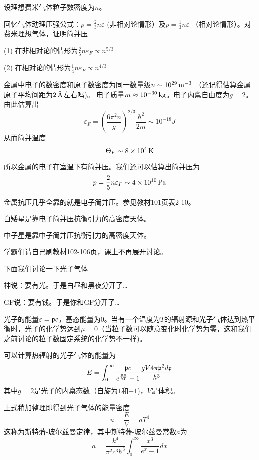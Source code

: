 \documentclass[CJK]{beamer}
\begin{document}
\begin{frame}
\bch
设理想费米气体粒子数密度为$n$。

\skiplines

回忆气体动理压强公式：$p =\frac{2}{3}n\bar\varepsilon$ (非相对论情形）及$p =\frac{1}{3}n\bar\varepsilon$ （相对论情形）。对费米理想气体，证明简并压
\bitem
\item[(1)]{在非相对论的情形为$\frac{2}{5}n\varepsilon_F \propto n^{5/3}$}
\item[(2)]{在相对论的情形为$\frac{1}{4}n\varepsilon_F \propto n^{4/3}$}
\eitem
\ech
\end{frame}


\begin{frame}
\bch
金属中电子的数密度和原子数密度为同一数量级$n\sim 10^{29} \,\mathrm{m}^{-3}$ （还记得估算金属原子平均间距为$2\,\text{\AA}$左右吗)。
电子质量$m\approx 10^{-30} \,\mathrm{kg}$。电子内禀自由度为$g = 2$。由此估算出
$$\varepsilon_F = \left(\frac{6\pi^2 n}{ g}\right)^{2/3} \frac{\hbar^2}{2m} \sim 10^{-18}J $$
从而简并温度
$$\Theta_F \sim 8\times 10^4 \,\mathrm{K}$$


所以金属的电子在室温下有简并压。我们还可以估算出简并压为
$$ p = \frac{2}{5} n \varepsilon_F \sim 4\times 10^{10}\,\mathrm{Pa}$$


金属抗压几乎全靠的就是电子简并压。参见教材101页表2-10。

\ech
\end{frame}


\begin{frame}
\bch
\bitem
\item{白矮星是靠电子简并压抗衡引力的高密度天体。}
\item{中子星是靠中子简并压抗衡引力的高密度天体。}
\eitem

学霸们请自己刷教材102-106页，课上不再展开讨论。

\ech
\end{frame}


\begin{frame}
\bch
{\Large
下面我们讨论一下光子气体
}


{\scriptsize
神说：要有光。于是白昼和黑夜分开了…

GF说：要有钱。于是你和GF分开了…}
\ech
\end{frame}

\begin{frame}
\bch
{\small
光子的能量$\varepsilon = {\mathfrak{p}} c$，基态能量为$0$。当有一个温度为$T$的辐射源和光子气体达到热平衡时，光子的化学势达到$\mu = 0$（当粒子数可以随意变化时化学势为零，这和我们之前讨论的粒子数固定系统的化学势不一样)。

可以计算热辐射的光子气体的能量为
$$E = \int_0^\infty \frac{{\mathfrak{p}} c}{e^{\frac{{\mathfrak{p}} c}{kT}}-1} \frac{g V 4\pi{\mathfrak{p}}^2 d{\mathfrak{p}}}{h^3} $$
其中$g=2$是光子的内禀态数（自旋为$1$和$-1$)，$V$是体积。

上式稍加整理即得到光子气体的能量密度
$$u = \frac{E}{V}= a T^4$$
这称为斯特藩-玻尔兹曼定律，其中斯特藩-玻尔兹曼常数$a$为
$$a = \frac{k^4}{\pi^2c^3\hbar^3}\int_0^\infty  \frac{x^3 }{e^x-1} dx$$
}
\ech
\end{frame}
\end{document}

